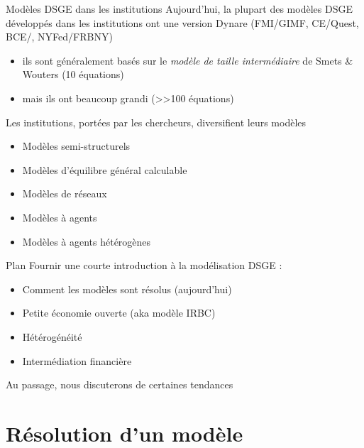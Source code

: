 \documentclass[
  ignorenonframetext,
]{beamer}
\providecommand{\tightlist}{%
  \setlength{\itemsep}{0pt}\setlength{\parskip}{0pt}}
\begin{document}
\begin{frame}{Modèles DSGE dans les institutions}
\label{moduxe8les-dsge-dans-les-institutions}
Aujourd'hui, la plupart des modèles DSGE développés dans les
institutions ont une version Dynare (FMI/GIMF, CE/Quest, BCE/,
NYFed/FRBNY)

\begin{itemize}
\tightlist
\item
  ils sont généralement basés sur le \emph{modèle de taille
  intermédiaire} de Smets \& Wouters (10 équations)
\item
  mais ils ont beaucoup grandi (\textgreater\textgreater100 équations)
\end{itemize}

\pause

Les institutions, portées par les chercheurs, diversifient leurs modèles

\begin{itemize}
\tightlist
\item
  Modèles semi-structurels
\item
  Modèles d'équilibre général calculable
\item
  Modèles de réseaux
\item
  Modèles à agents
\item
  Modèles à agents hétérogènes
\end{itemize}
\end{frame}

\begin{frame}{Plan}
\label{plan}
Fournir une courte introduction à la modélisation DSGE :

\begin{itemize}
\tightlist
\item
  Comment les modèles sont résolus (aujourd'hui)
\item
  Petite économie ouverte (aka modèle IRBC)
\item
  Hétérogénéité
\item
  Intermédiation financière
\end{itemize}

Au passage, nous discuterons de certaines tendances
\end{frame}

\section{Résolution d'un modèle}\label{ruxe9solution-dun-moduxe8le}
\end{document}
